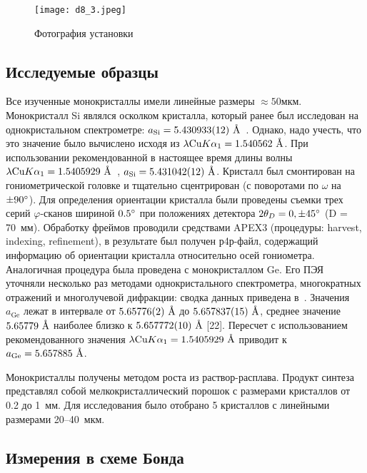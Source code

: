 \begin{figure}[ht!]
    \centering
    \texttt{[image: d8\_3.jpeg]}
    \caption{Фотография установки}%
    \label{fig:D8_photo}
\end{figure}

\subsection{Исследуемые образцы}

Все изученные монокристаллы имели линейные размеры $\approx50\unit{мкм}$.
Монокристалл Si являлся осколком кристалла, который ранее был исследован на однокристальном спектрометре: $a_\text{Si} = 5.430933 (12)\ \text{\AA}$~\cite{Lisoivan:1982}.
Однако, надо учесть, что это значение было вычислено исходя из $\lambda \text{Cu} K\alpha_1 = 1.540562\ \text{\AA}$.
При использовании рекомендованной в настоящее время длины волны $\lambda \text{Cu} K\alpha_1 = 1.5405929\ \text{\AA}$~\cite{Holzer:1997}, $a_\text{Si} = 5.431042(12)\ \text{\AA}$.
Кристалл был смонтирован на гониометрической головке и тщательно сцентрирован (с поворотами по $\omega$ на $\pm 90^\circ$). Для определения ориентации кристалла были проведены съемки трех серий $\varphi$-сканов шириной $0.5^\circ$ при положениях детектора $2\theta_D = 0, \pm 45^\circ$ (D = 70~мм).
Обработку фреймов проводили средствами APEX3 (процедуры: harvest, indexing, refinement), в результате был получен р4р-файл, содержащий информацию об ориентации кристалла относительно осей гониометра.
Аналогичная процедура была проведена с монокристаллом Ge.
Его ПЭЯ уточняли несколько раз методами однокристального спектрометра, многократных отражений и многолучевой дифракции: сводка данных приведена в~\cite{Lisoivan:1982}.
Значения $a_\text{Ge}$ лежат в интервале от $5.65776(2)\ \text{\AA}$ до $5.657837(15)\ \text{\AA}$, среднее значение $5.65779\ \text{\AA}$ наиболее близко к $5.657772(10)\ \text{\AA}$ [22].
Пересчет с использованием рекомендованного значения $\lambda \text{Cu} K\alpha_1 = 1.5405929\ \text{\AA}$ приводит к $a_\text{Ge} = 5.657885\ \text{\AA}$.

Монокристаллы \YEu{} получены методом роста из раствор-рас\-плава.
Продукт синтеза представлял собой мелкокристаллический порошок с размерами кристаллов от 0.2 до 1~мм.
Для исследования было отобрано 5 кристаллов с линейными размерами 20--40~мкм.

\subsection{Измерения в схеме Бонда}


